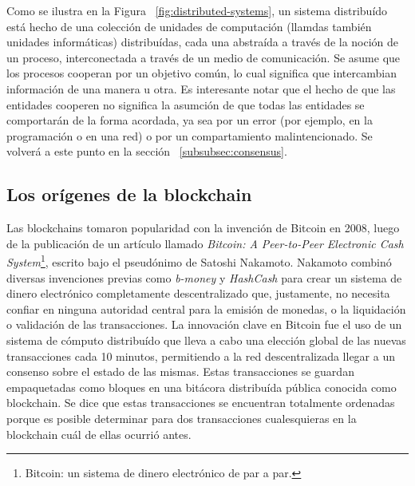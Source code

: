 Como se ilustra en la Figura ~\ref{fig:distributed-systems}, un sistema distribuído está hecho de una
colección de unidades de computación (llamdas también unidades informáticas) distribuídas, cada una
abstraída a través de la noción de un proceso, interconectada a través de un medio de comunicación.
Se asume que los procesos cooperan por un objetivo común, lo cual significa que intercambian
información de una manera u otra. Es interesante notar que el hecho de que las entidades
cooperen no significa la asumción de que todas las entidades se comportarán de la forma
acordada, ya sea por un error (por ejemplo, en la programación o en una red) o por un compartamiento
malintencionado. Se volverá a este punto en la sección ~\ref{subsubsec:consensus}.

\subsection{Los orígenes de la blockchain}
Las blockchains tomaron popularidad con la invención de Bitcoin en 2008, luego de la publicación
de un artículo llamado \textit{Bitcoin: A Peer-to-Peer
Electronic Cash System}\footnote{Bitcoin: un sistema de dinero electrónico de par a par.}, escrito
bajo el pseudónimo de Satoshi Nakamoto.
Nakamoto combinó diversas invenciones previas como
\textit{b-money} y \textit{HashCash} para crear un sistema de dinero electrónico completamente
descentralizado que, justamente, no necesita confiar en ninguna autoridad central para la emisión de monedas,
o la liquidación o validación de las transacciones. 
La innovación clave en Bitcoin fue el uso de un sistema de cómputo distribuído que lleva
a cabo una elección global de las nuevas transacciones cada 10 minutos, permitiendo
a la red descentralizada llegar a un consenso sobre el estado de las mismas. Estas transacciones
se guardan empaquetadas como bloques en una bitácora distribuída pública conocida como blockchain.
Se dice que estas transacciones se encuentran totalmente ordenadas porque es posible determinar para
dos transacciones cualesquieras en la blockchain cuál de ellas ocurrió antes.


